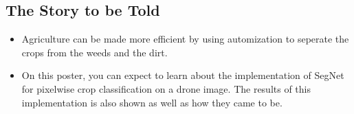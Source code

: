 \documentclass[
    ,title     = {{Image Segmentation for Smart Agriculture}}
    ,subject   = {{This is the subject of my work}}
    ,papersize = {{a1paper}}
    ,nocrop
]{dtuposter}
\begin{document}
%
%
\begin{dtuposterhead} %
\end{dtuposterhead}
%
%
\begin{dtupostercontent}
\section{The Story to be Told}
\begin{itemize}
	\item Agriculture can be made more efficient by using automization to seperate the crops from the weeds and the dirt.
	\item On this poster, you can expect to learn about the implementation of SegNet for pixelwise crop classification on a drone image. The results of this implementation is also shown as well as how they came to be.
\end{itemize}
 

\end{dtupostercontent}
\end{document}
